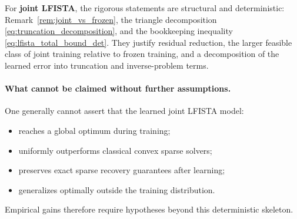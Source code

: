 For \textbf{joint LFISTA}, the rigorous statements are structural and deterministic: Remark~\ref{rem:joint_vs_frozen}, the triangle decomposition \eqref{eq:truncation_decomposition}, and the bookkeeping inequality \eqref{eq:lfista_total_bound_det}.
They justify residual reduction, the larger feasible class of joint training relative to frozen training, and a decomposition of the learned error into truncation and inverse-problem terms.

\paragraph{What cannot be claimed without further assumptions.}
One generally cannot assert that the learned joint LFISTA model:
\begin{itemize}
  \item reaches a global optimum during training;
  \item uniformly outperforms classical convex sparse solvers;
  \item preserves exact sparse recovery guarantees after learning;
  \item generalizes optimally outside the training distribution.
\end{itemize}
Empirical gains therefore require hypotheses beyond this deterministic skeleton.
